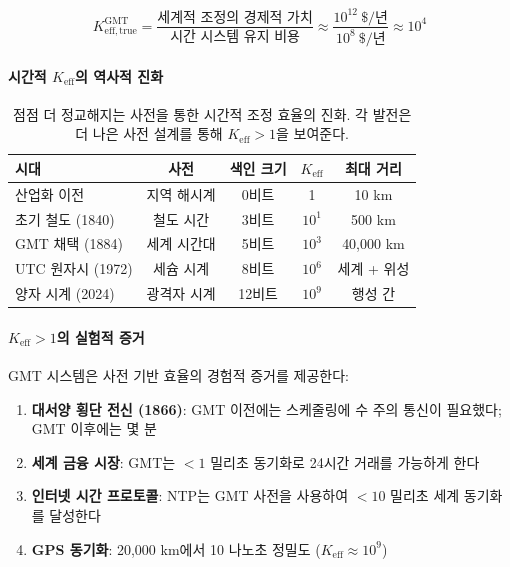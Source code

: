 \documentclass[11pt,a4paper]{article}
\begin{document}
	\begin{equation}
		K_{\mathrm{eff, true}}^{\mathrm{GMT}} = \frac{\text{세계적 조정의 경제적 가치}}{\text{시간 시스템 유지 비용}} \approx \frac{10^{12}\ \text{\$/년}}{10^8\ \text{\$/년}} \approx 10^4
	\end{equation}
	
	\paragraph{시간적 $K_{\mathrm{eff}}$의 역사적 진화}
	\begin{table}[htbp]
		\centering
		\begin{tabular}{lcccc}
			\toprule
			\textbf{시대} & \textbf{사전} & \textbf{색인 크기} & \textbf{$K_{\mathrm{eff}}$} & \textbf{최대 거리} \\
			\midrule
			산업화 이전 & 지역 해시계 & 0비트 & 1 & 10 km \\
			초기 철도 (1840) & 철도 시간 & 3비트 & $10^1$ & 500 km \\
			GMT 채택 (1884) & 세계 시간대 & 5비트 & $10^3$ & 40,000 km \\
			UTC 원자시 (1972) & 세슘 시계 & 8비트 & $10^6$ & 세계 + 위성 \\
			양자 시계 (2024) & 광격자 시계 & 12비트 & $10^9$ & 행성 간 \\
			\bottomrule
		\end{tabular}
		\caption{점점 더 정교해지는 사전을 통한 시간적 조정 효율의 진화. 각 발전은 더 나은 사전 설계를 통해 $K_{\mathrm{eff}} > 1$을 보여준다.}
		\label{tab:time-keff-evolution}
	\end{table}
	
	\paragraph{$K_{\mathrm{eff}} > 1$의 실험적 증거}
	GMT 시스템은 사전 기반 효율의 경험적 증거를 제공한다:
	\begin{enumerate}
		\item \textbf{대서양 횡단 전신 (1866)}: GMT 이전에는 스케줄링에 수 주의 통신이 필요했다; GMT 이후에는 몇 분
		\item \textbf{세계 금융 시장}: GMT는 $<1$ 밀리초 동기화로 24시간 거래를 가능하게 한다
		\item \textbf{인터넷 시간 프로토콜}: NTP는 GMT 사전을 사용하여 $<10$ 밀리초 세계 동기화를 달성한다
		\item \textbf{GPS 동기화}: 20,000 km에서 10 나노초 정밀도 ($K_{\mathrm{eff}} \approx 10^9$)
	\end{enumerate}
	
\end{document}
